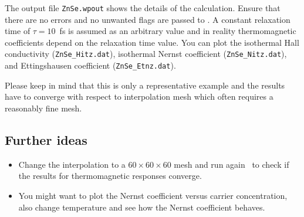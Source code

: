 \documentclass[a4paper,11pt,twoside]{article}
\begin{document}
The output file {\tt ZnSe.wpout} shows the details of the calculation. Ensure that there are no errors and no unwanted flags are passed to \nw . A constant relaxation time of $\tau=10$~fs is assumed as an arbitrary value and in reality thermomagnetic coefficients depend on the relaxation time value. You can plot the isothermal Hall conductivity ({\tt ZnSe\_Hitz.dat}), isothermal Nernst coefficient ({\tt ZnSe\_Nitz.dat}), and Ettingshausen coefficient ({\tt ZnSe\_Etnz.dat}).

Please keep in mind that this is only a representative example and the results have to converge with respect to interpolation mesh which often requires a reasonably fine mesh.  

\subsection*{Further ideas}

\begin{itemize}
\item Change the interpolation to a $60\times 60\times 60$ mesh and run again \postw\ to check if the results for thermomagnetic responses converge. 

\item You might want to plot the Nernst coefficient versus carrier concentration, also change temperature and see how the Nernst coefficient behaves.

\end{itemize}



\end{document}
